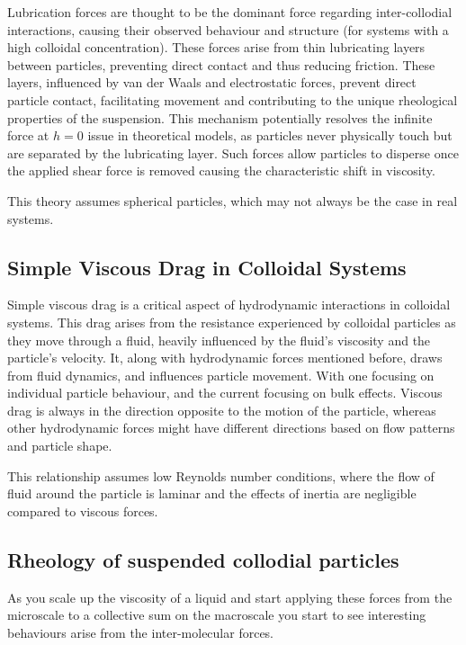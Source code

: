 Lubrication forces are thought to be the dominant force regarding inter-collodial interactions, causing their observed behaviour and structure (for systems with a high colloidal concentration). These forces arise from thin lubricating layers between particles, preventing direct contact and thus reducing friction. These layers, influenced by van der Waals and electrostatic forces, prevent direct particle contact, facilitating movement and contributing to the unique rheological properties of the suspension. This mechanism potentially resolves the infinite force at $h = 0$ issue in theoretical models, as particles never physically touch but are separated by the lubricating layer. Such forces allow particles to disperse once the applied shear force is removed causing the characteristic shift in viscosity. \cite{LubricationTheoryReference}

This theory assumes spherical particles, which may not always be the case in real systems.\cite{LubricationTheoryReference}

\subsection{Simple Viscous Drag in Colloidal Systems}

Simple viscous drag is a critical aspect of hydrodynamic interactions in colloidal systems. This drag arises from the resistance experienced by colloidal particles as they move through a fluid, heavily influenced by the fluid's viscosity and the particle's velocity. It, along with hydrodynamic forces mentioned before, draws from fluid dynamics, and influences particle movement. With one focusing on individual particle behaviour, and the current focusing on bulk effects. Viscous drag is always in the direction opposite to the motion of the particle, whereas other hydrodynamic forces might have different directions based on flow patterns and particle shape.

This relationship assumes low Reynolds number conditions, where the flow of fluid around the particle is laminar and the effects of inertia are negligible compared to viscous forces.

\subsection{Rheology of suspended collodial particles}

As you scale up the viscosity of a liquid and start applying these forces from the microscale to a collective sum on the macroscale you start to see interesting behaviours arise from the inter-molecular forces.

